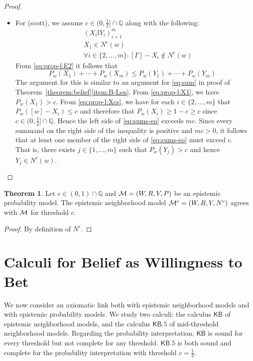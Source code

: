 \documentclass[12pt]{article}
\theoremstyle{definition}
\newtheorem{theorem}{Theorem}[section]
\newcommand{\Rat}{\mathbb{Q}}  %
\newcommand{\M}{{\cal M}}      %
\newcommand{\KB}{{\mathsf{KB}}}                 %
\newcommand{\KBeq}{{\mathsf{KB.5}}}             %
\begin{document}
\begin{proof}
\begin{itemize}
  \item For (scott), we assume $c\in(0,\frac 12]\cap\Rat$ along with the
    following:
    \begin{eqnarray}
      &&
      (X_i\mathbb{I}Y_i)_{i=1}^m
      \label{eq:prop-l:E2} 
      \\ &&
      X_1\in N^c(w) 
      \label{eq:prop-l:X1} 
      \\ && 
      \forall i\in\{2,\dots,m\}: [\Gamma]-X_i\notin N^c(w) 
      \label{eq:prop-l:Xcs} 
    \end{eqnarray}
    From \eqref{eq:prop-l:E2} it follows that
    \begin{equation}
      P_w (X_1)+\cdots+P_w(X_m)\leq
      P_w(Y_1)+\cdots+ P_w(Y_m)
      \label{eq:sums-eq}
    \end{equation}
    The argument for this is similar to an argument for \eqref{eq:sum}
    in proof of Theorem~\ref{theorem:belief}\eqref{item:B-Len}.  From
    \eqref{eq:prop-l:X1}, we have $P_w(X_1)>c$.  From
    \eqref{eq:prop-l:Xcs}, we have for each $i\in\{2,\dots,m\}$ that
    $P_w([w]-X_i)\leq c$ and therefore that $P_w(X_i)\geq
    1-c\geq c$ since $c\in(0,\frac 12]\cap\Rat$.  Hence the left side
    of \eqref{eq:sums-eq} exceeds $mc$.  Since every summand on the
    right side of the inequality is positive and $mc>0$, it follows
    that at least one member of the right side of \eqref{eq:sums-eq}
    must exceed $c$.  That is, there exists $j\in\{1,\dots,m\}$ such
    that $P_w(Y_j) > c$ and hence $Y_j\in N^c(w)$.  \qedhere
  \end{itemize}
\end{proof}

\begin{theorem}
  Let $c\in(0,1)\cap\Rat$ and $\M=(W,R,V,P)$ be an epistemic
  probability model. The epistemic neighborhood model
  $\M^c=(W,R,V,N^c)$ agrees with $\M$ for threshold $c$.
\end{theorem}
\begin{proof}
  By definition of $N^c$.
\end{proof}

\section{Calculi for Belief as Willingness to Bet}
\label{Section:Calculi}

We now consider an axiomatic link both with epistemic neighborhood
models and with epistemic probability models.  We study two calculi:
the calculus $\KB$ of epistemic neighborhood models, and the calculus
$\KBeq$ of mid-threshold neighborhood models.  Regarding the
probability interpretation, $\KB$ is sound for every threshold but not
complete for any threshold.  $\KBeq$ is both sound and complete for
the probability interpretation with threshold $c=\frac 12$.
\end{document}

